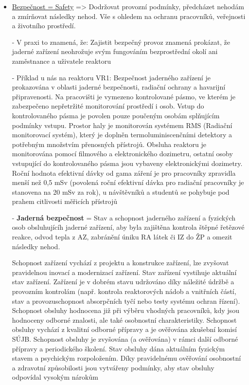 \begin{itemize}
    \item \underline{Bezpečnost = Safety} => Dodržovat provozní podmínky, předcházet nehodám a zmírňovat následky nehod. Vše s ohledem na ochranu pracovníků, veřejnosti a životního prostředí.

    - V praxi to znamená, že: Zajistit bezpečný provoz znamená prokázat, že jaderné zařízení neohrožuje svým fungováním bezprostřední okolí ani zaměstnance a uživatele reaktoru

    - Příklad u nás na reaktoru VR1: Bezpečnost jaderného zařízení je prokazována v oblasti jaderné bezpečnosti, radiační ochrany a havarijní připravenosti. Na pracovišti je vymezeno kontrolované pásmo, ve kterém je zabezpečeno nepřetržité monitorování prostředí i osob. Vstup do kontrolovaného pásma je povolen pouze poučeným osobám splňujícím podmínky vstupu. Prostor haly je monitorován systémem RMS (Radiační monitorovací systém), který je doplněn termoluminiscenčními detektory a potřebným množstvím přenosných přístrojů. Obsluha reaktoru je monitorována pomocí filmového a elektronického dozimetru, ostatní osoby vstupující do kontrolovaného pásma jsou vybaveny elektronickými dozimetry. Roční hodnota efektivní dávky od gama záření je pro pracovníky zpravidla menší než 0,5 mSv (povolená roční efektivní dávka pro radiační pracovníky je stanovena na 20 mSv za rok), u návštěvníků a studentů se pohybuje pod prahem citlivosti měřicích přístrojů

    \noindent -	\textbf{Jaderná bezpečnost} = Stav a schopnost jaderného zařízení a fyzických osob obsluhujícíh jaderné zařízení, aby byla zajištěna kontrola štěpné řetězové reakce, odvod tepla z AZ, zabránění úniku RA látek či IZ do ŽP a omezit následky nehod.

    Schopnost zařízení vychází z projektu a konstrukce zařízení, lze zvyšovat pravidelnou inovací a modernizací zařízení. Stav zařízení vystihuje aktuální stav zařízení. Zařízení je v dobrém stavu udržováno díky náležité údržbě a provozním kontrolám (např. kontrola reaktorových nádob a vnitřních částí, stav a provozuschopnost absorpčních tyčí nebo testy systému ochran řízení). Schopnost obsluhy hodnocena již při výběru vhodných pracovníků, kdy jsou hodnoceny odborné znalosti, ale také osobnostní charakteristiky. Schopnost obsluhy vychází z kvalitní odborné přípravy a je ověřována zkušební komisí SÚJB. Schopnost obsluhy je zvyšována (a ověřována) v rámci další odborné přípravy a periodického školení. Stav obsluhy dána aktuálním fyzickým stavem a psychickým rozpoložením. Díky pravidelnému ověřování osobnostní a zdravotní způsobilosti jsou vytvářeny podmínky, aby stav obsluhy odpovídal vysokým nárokům


\end{itemize}
